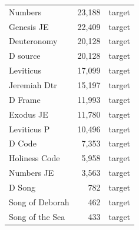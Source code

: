 \begin{table}[!ht]
\begin{tabular}{lrl}
Numbers & 23{,}188 & target \\
Genesis JE & 22{,}409 & target \\
Deuteronomy & 20{,}128 & target \\
D source & 20{,}128 & target \\
Leviticus & 17{,}099 & target \\
Jeremiah Dtr & 15{,}197 & target \\
D Frame & 11{,}993 & target \\
Exodus JE & 11{,}780 & target \\
Leviticus P & 10{,}496 & target \\
D Code & 7{,}353 & target \\
Holiness Code & 5{,}958 & target \\
Numbers JE & 3{,}563 & target \\
D Song & 782 & target \\
Song of Deborah & 462 & target \\
Song of the Sea & 433 & target \\
\hline
\end{tabular}
\label{tab:s5_words}
\end{table}
